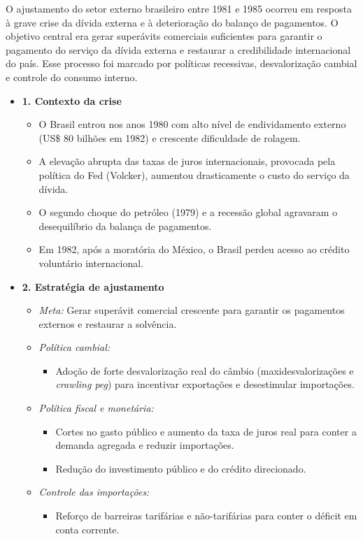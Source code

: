 \documentclass[a4paper,12pt]{article}[abntex2]
\begin{document}
O ajustamento do setor externo brasileiro entre 1981 e 1985 ocorreu em resposta à grave crise da dívida externa e à deterioração do balanço de pagamentos. O objetivo central era gerar superávits comerciais suficientes para garantir o pagamento do serviço da dívida externa e restaurar a credibilidade internacional do país. Esse processo foi marcado por políticas recessivas, desvalorização cambial e controle do consumo interno.

\begin{itemize}
    \item \textbf{1. Contexto da crise}
    \begin{itemize}
        \item O Brasil entrou nos anos 1980 com alto nível de endividamento externo (US\$ 80 bilhões em 1982) e crescente dificuldade de rolagem.
        \item A elevação abrupta das taxas de juros internacionais, provocada pela política do Fed (Volcker), aumentou drasticamente o custo do serviço da dívida.
        \item O segundo choque do petróleo (1979) e a recessão global agravaram o desequilíbrio da balança de pagamentos.
        \item Em 1982, após a moratória do México, o Brasil perdeu acesso ao crédito voluntário internacional.
    \end{itemize}

    \item \textbf{2. Estratégia de ajustamento}
    \begin{itemize}
        \item \textit{Meta:} Gerar superávit comercial crescente para garantir os pagamentos externos e restaurar a solvência.
        \item \textit{Política cambial:} 
        \begin{itemize}
            \item Adoção de forte desvalorização real do câmbio (maxidesvalorizações e \textit{crawling peg}) para incentivar exportações e desestimular importações.
        \end{itemize}
        \item \textit{Política fiscal e monetária:}
        \begin{itemize}
            \item Cortes no gasto público e aumento da taxa de juros real para conter a demanda agregada e reduzir importações.
            \item Redução do investimento público e do crédito direcionado.
        \end{itemize}
        \item \textit{Controle das importações:}
        \begin{itemize}
            \item Reforço de barreiras tarifárias e não-tarifárias para conter o déficit em conta corrente.
        \end{itemize}
    \end{itemize}


\end{itemize}
\end{document}
